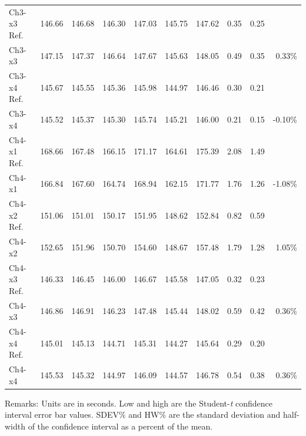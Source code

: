 \begin{table}[htbp]
\begin{center}
\begin{tabular}{
			l
			S[table-format=3.2]
			S[table-format=3.2]
			S[table-format=3.2]
			S[table-format=3.2]
			S[table-format=3.2]
			S[table-format=3.2]
			S[table-format=1.2]
			S[table-format=1.2]
			r}
		Ch3-x3 Ref. & 146.66  & 146.68  & 146.30  & 147.03  & 145.75  & 147.62  & 0.35  & 0.25 & \\
		Ch3-x3 & 147.15  & 147.37  & 146.64  & 147.67  & 145.63  & 148.05  & 0.49  & 0.35 & 0.33\% \\
		Ch3-x4 Ref. & 145.67  & 145.55  & 145.36  & 145.98  & 144.97  & 146.46  & 0.30  & 0.21 & \\
		Ch3-x4 & 145.52  & 145.37  & 145.30  & 145.74  & 145.21  & 146.00  & 0.21  & 0.15 & -0.10\% \\
		Ch4-x1 Ref. & 168.66  & 167.48  & 166.15  & 171.17  & 164.61  & 175.39  & 2.08  & 1.49 & \\
		Ch4-x1 & 166.84  & 167.60  & 164.74  & 168.94  & 162.15  & 171.77  & 1.76  & 1.26 & -1.08\% \\
		Ch4-x2 Ref. & 151.06  & 151.01  & 150.17  & 151.95  & 148.62  & 152.84  & 0.82  & 0.59 & \\
		Ch4-x2 & 152.65  & 151.96  & 150.70  & 154.60  & 148.67  & 157.48  & 1.79  & 1.28 & 1.05\% \\
		Ch4-x3 Ref. & 146.33  & 146.45  & 146.00  & 146.67  & 145.58  & 147.05  & 0.32  & 0.23 & \\
		Ch4-x3 & 146.86  & 146.91  & 146.23  & 147.48  & 145.44  & 148.02  & 0.59  & 0.42 & 0.36\% \\
		Ch4-x4 Ref. & 145.01  & 145.13  & 144.71  & 145.31  & 144.27  & 145.64  & 0.29  & 0.20 & \\
		Ch4-x4 & 145.53  & 145.32  & 144.97  & 146.09  & 144.57  & 146.78  & 0.54  & 0.38 & 0.36\% \\
		
		\bottomrule
	\end{tabular}
	\hspace*{-2cm}
	\end{center}
	
	Remarks: Units are in seconds. Low and high are the Student-\textit{t} confidence interval error bar values. SDEV\% and HW\% are the standard deviation and half-width of the confidence interval as a percent of the mean.
\end{table}%

